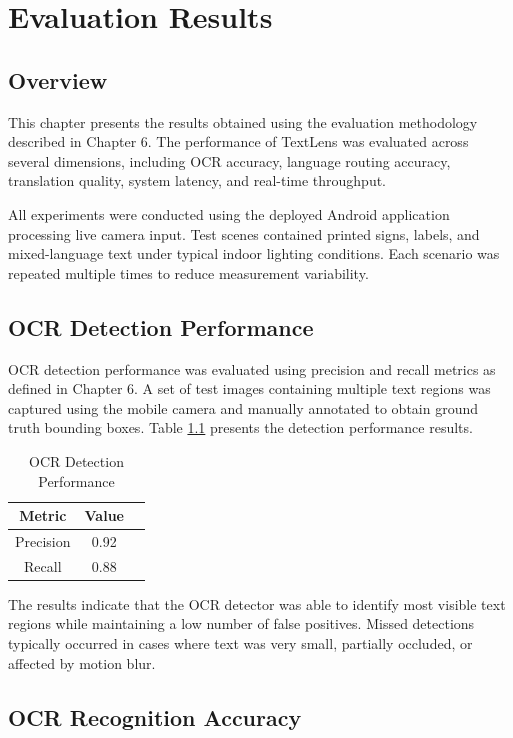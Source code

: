 \chapter{Evaluation Results}

\section{Overview}

This chapter presents the results obtained using the evaluation methodology described in Chapter 6. The performance of TextLens was evaluated across several dimensions, including OCR accuracy, language routing accuracy, translation quality, system latency, and real-time throughput.

All experiments were conducted using the deployed Android application processing live camera input. Test scenes contained printed signs, labels, and mixed-language text under typical indoor lighting conditions. Each scenario was repeated multiple times to reduce measurement variability.

\section{OCR Detection Performance}

OCR detection performance was evaluated using precision and recall metrics as defined in Chapter 6. A set of test images containing multiple text regions was captured using the mobile camera and manually annotated to obtain ground truth bounding boxes. Table \ref{tab:ocr_detection} presents the detection performance results.

\begin{table}[H]
\centering
\caption{OCR Detection Performance}
\label{tab:ocr_detection}
\begin{tabular}{|c|c|c|}
\hline
Metric & Value \\
\hline
Precision & 0.92 \\
Recall & 0.88 \\
\hline
\end{tabular}
\end{table}

The results indicate that the OCR detector was able to identify most visible text regions while maintaining a low number of false positives. Missed detections typically occurred in cases where text was very small, partially occluded, or affected by motion blur.

\section{OCR Recognition Accuracy}

